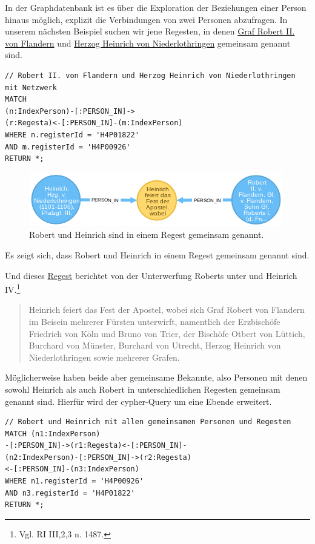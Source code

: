 \documentclass[ngerman,]{scrreprt}
\begin{document}
In der Graphdatenbank ist es über die Exploration der Beziehungen einer Person hinaus möglich, explizit die Verbindungen von zwei Personen abzufragen. In unserem nächsten Beispiel suchen wir jene Regesten, in denen \href{https://de.wikipedia.org/wiki/Robert_II._(Flandern)}{Graf Robert II. von Flandern} und \href{https://de.wikipedia.org/wiki/Heinrich_I._(Limburg)}{Herzog Heinrich von Niederlothringen} gemeinsam genannt sind.

\begin{verbatim}
// Robert II. von Flandern und Herzog Heinrich von Niederlothringen mit Netzwerk
MATCH
(n:IndexPerson)-[:PERSON_IN]->
(r:Regesta)<-[:PERSON_IN]-(m:IndexPerson)
WHERE n.registerId = 'H4P01822'
AND m.registerId = 'H4P00926'
RETURN *;
\end{verbatim}

\begin{figure}
\centering
\includegraphics{Bilder/RI2Graph/RobertundHeinrich.png}
\caption{Robert und Heinrich sind in einem Regest gemeinsam genannt.}
\end{figure}

Es zeigt sich, dass Robert und Heinrich in einem Regest gemeinsam genannt sind.

Und dieses \href{http://www.regesta-imperii.de/id/cf75356b-bd0d-4a67-8aeb-3ae27d1dcefa}{Regest} berichtet von der Unterwerfung Roberts unter und Heinrich IV.\footnote{Vgl. RI III,2,3 n. 1487.}

\begin{quote}
Heinrich feiert das Fest der Apostel, wobei sich Graf Robert von Flandern im Beisein mehrerer Fürsten unterwirft, namentlich der Erzbischöfe Friedrich von Köln und Bruno von Trier, der Bischöfe Otbert von Lüttich, Burchard von Münster, Burchard von Utrecht, Herzog Heinrich von Niederlothringen sowie mehrerer Grafen.
\end{quote}

Möglicherweise haben beide aber gemeinsame Bekannte, also Personen mit denen sowohl Heinrich als auch Robert in unterschiedlichen Regesten gemeinsam genannt sind. Hierfür wird der cypher-Query um eine Ebende erweitert.

\begin{verbatim}
// Robert und Heinrich mit allen gemeinsamen Personen und Regesten
MATCH (n1:IndexPerson)
-[:PERSON_IN]->(r1:Regesta)<-[:PERSON_IN]-
(n2:IndexPerson)-[:PERSON_IN]->(r2:Regesta)
<-[:PERSON_IN]-(n3:IndexPerson)
WHERE n1.registerId = 'H4P00926'
AND n3.registerId = 'H4P01822'
RETURN *;
\end{verbatim}
\end{document}
